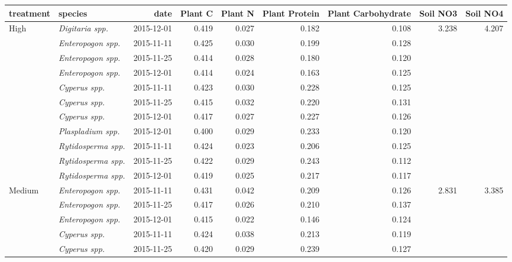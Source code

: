 \documentclass[
]{article}
\begin{document}
\begin{tbl}

\begin{minipage}{\linewidth}

\begingroup
\setlength{}
\setlength{}\fontsize{8.2pt}{9.9pt}\selectfont
\begin{longtable*}{@{\extracolsep{\fill}}llrrrrrrr}
\toprule
treatment & species & date & Plant C & Plant N & Plant Protein & Plant Carbohydrate & Soil NO3 & Soil NO4 \\ 
\midrule\addlinespace[2.5pt]
High & {\itshape Digitaria spp.} & 2015-12-01 & 0.419 & 0.027 & 0.182 & 0.108 & 3.238 & 4.207 \\ 
 & {\itshape Enteropogon spp.} & 2015-11-11 & 0.425 & 0.030 & 0.199 & 0.128 &  &  \\ 
 & {\itshape Enteropogon spp.} & 2015-11-25 & 0.414 & 0.028 & 0.180 & 0.120 &  &  \\ 
 & {\itshape Enteropogon spp.} & 2015-12-01 & 0.414 & 0.024 & 0.163 & 0.125 &  &  \\ 
 & {\itshape Cyperus spp.} & 2015-11-11 & 0.423 & 0.030 & 0.228 & 0.125 &  &  \\ 
 & {\itshape Cyperus spp.} & 2015-11-25 & 0.415 & 0.032 & 0.220 & 0.131 &  &  \\ 
 & {\itshape Cyperus spp.} & 2015-12-01 & 0.417 & 0.027 & 0.227 & 0.126 &  &  \\ 
 & {\itshape Plaspladium spp.} & 2015-12-01 & 0.400 & 0.029 & 0.233 & 0.120 &  &  \\ 
 & {\itshape Rytidosperma spp.} & 2015-11-11 & 0.424 & 0.023 & 0.206 & 0.125 &  &  \\ 
 & {\itshape Rytidosperma spp.} & 2015-11-25 & 0.422 & 0.029 & 0.243 & 0.112 &  &  \\ 
 & {\itshape Rytidosperma spp.} & 2015-12-01 & 0.419 & 0.025 & 0.217 & 0.117 &  &  \\ 
Medium & {\itshape Enteropogon spp.} & 2015-11-11 & 0.431 & 0.042 & 0.209 & 0.126 & 2.831 & 3.385 \\ 
 & {\itshape Enteropogon spp.} & 2015-11-25 & 0.417 & 0.026 & 0.210 & 0.137 &  &  \\ 
 & {\itshape Enteropogon spp.} & 2015-12-01 & 0.415 & 0.022 & 0.146 & 0.124 &  &  \\ 
 & {\itshape Cyperus spp.} & 2015-11-11 & 0.424 & 0.038 & 0.213 & 0.119 &  &  \\ 
 & {\itshape Cyperus spp.} & 2015-11-25 & 0.420 & 0.029 & 0.239 & 0.127 &  &  \\ 

\end{longtable*}
\end{minipage}
\end{tbl}
\end{document}
